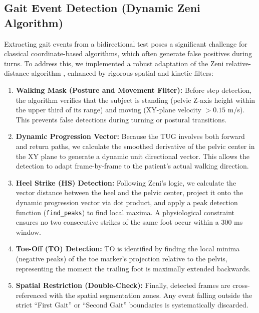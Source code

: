 \documentclass{article}
\begin{document}
\subsection{Gait Event Detection (Dynamic Zeni Algorithm)}
Extracting gait events from a bidirectional test poses a significant challenge for classical coordinate-based algorithms, which often generate false positives during turns. To address this, we implemented a robust adaptation of the Zeni relative-distance algorithm \cite{zeni2008two}, enhanced by rigorous spatial and kinetic filters:

\begin{enumerate}
    \item \textbf{Walking Mask (Posture and Movement Filter):} Before step detection, the algorithm verifies that the subject is standing (pelvic Z-axis height within the upper third of its range) and moving (XY-plane velocity $> 0.15$ m/s). This prevents false detections during turning or postural transitions.
    \item \textbf{Dynamic Progression Vector:} Because the TUG involves both forward and return paths, we calculate the smoothed derivative of the pelvic center in the XY plane to generate a dynamic unit directional vector. This allows the detection to adapt frame-by-frame to the patient's actual walking direction.
    \item \textbf{Heel Strike (HS) Detection:} Following Zeni's logic, we calculate the vector distance between the heel and the pelvic center, project it onto the dynamic progression vector via dot product, and apply a peak detection function (\texttt{find\_peaks}) to find local maxima. A physiological constraint ensures no two consecutive strikes of the same foot occur within a 300 ms window.
    \item \textbf{Toe-Off (TO) Detection:} TO is identified by finding the local minima (negative peaks) of the toe marker's projection relative to the pelvis, representing the moment the trailing foot is maximally extended backwards.
    \item \textbf{Spatial Restriction (Double-Check):} Finally, detected frames are cross-referenced with the spatial segmentation zones. Any event falling outside the strict ``First Gait'' or ``Second Gait'' boundaries is systematically discarded.
\end{enumerate}
\end{document}
